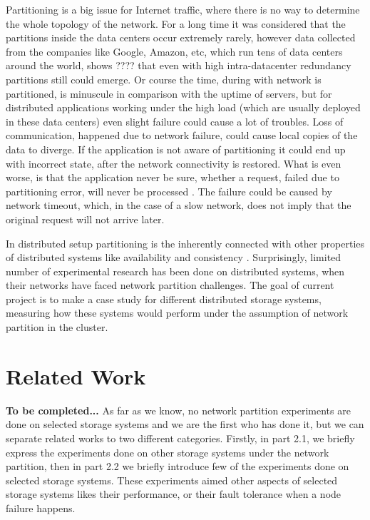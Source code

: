 \documentclass[a4paper]{article}
\begin{document}
Partitioning is a big issue for Internet traffic, where there is no way to determine the whole topology of the network.
For a long time it was considered that the partitions inside the data centers occur extremely rarely, however data collected from the companies like Google, Amazon, etc, which run tens of data centers around the world, shows ???? that even with high intra-datacenter redundancy partitions still could emerge.
Or course the time, during with network is partitioned, is minuscule in comparison with the uptime of servers, but for distributed applications working under the high load (which are usually deployed in these data centers) even slight failure could cause a lot of troubles.
Loss of communication, happened due to network failure, could cause local copies of the data to diverge.
If the application is not aware of partitioning it could end up with incorrect state, after the network connectivity is restored.
What is even worse, is that the application never be sure, whether a request, failed due to partitioning error, will never be processed . 
The failure could be caused by network timeout, which, in the case of a slow network, does not imply that the original request will not arrive later.

In distributed setup partitioning is the inherently connected with other properties of distributed systems like availability and consistency \cite{brewer2000towards}.
Surprisingly, limited number of experimental research has been done on distributed systems, when their networks have faced network partition challenges. 
The goal of current project is to make a case study for different distributed storage systems, measuring how these systems would perform under the assumption of network partition in the cluster.


\section{Related Work}

{\bf To be completed...}
As far as we know, no network partition experiments are done on selected storage systems and we are the first who has done it, but we can separate related works to two different categories. Firstly, in part 2.1, we briefly express the experiments done on other storage systems under the network partition, then in part 2.2 we briefly introduce few of the experiments done on selected storage systems. These experiments aimed other aspects of selected storage systems likes their performance, or their fault tolerance when a node failure happens.
\end{document}
